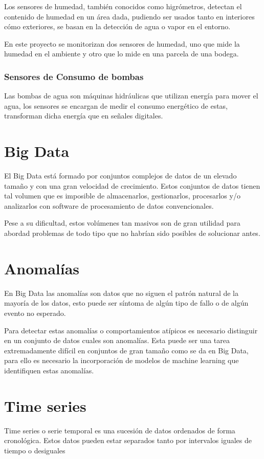 Los sensores de humedad, también conocidos como higrómetros, detectan el contenido de humedad en un área dada, pudiendo ser usados tanto en interiores cómo exteriores, se basan en la detección de agua o vapor en el entorno.

En este proyecto se monitorizan dos sensores de humedad, uno que mide la humedad en el ambiente y otro que lo mide en una parcela de una bodega.

\subsubsection{Sensores de Consumo de bombas}

Las bombas de agua son máquinas hidráulicas que utilizan energía para mover el agua, los sensores se encargan de medir el consumo energético de estas, transforman dicha energía que en señales digitales.  

\section{Big Data}

El Big Data está formado por conjuntos complejos de datos de un elevado tamaño y con una gran velocidad de crecimiento. Estos conjuntos de datos tienen tal volumen que es imposible de almacenarlos, gestionarlos, procesarlos y/o analizarlos con software de procesamiento de datos convencionales.

Pese a su dificultad, estos volúmenes tan masivos son de gran utilidad para abordad problemas de todo tipo que no habrían sido posibles de solucionar antes. \cite{pagina:Oracle_big_data}

\section{Anomalías}

En Big Data las anomalías son datos que no siguen el patrón natural de la mayoría de los datos, esto puede ser síntoma de algún tipo de fallo o de algún evento no esperado. 

Para detectar estas anomalías o comportamientos atípicos es necesario distinguir en un conjunto de datos cuales son anomalías. Esta puede ser una tarea extremadamente difícil en conjuntos de gran tamaño como se da en Big Data, para ello es necesario la incorporación de modelos de machine learning que identifiquen estas anomalías.\cite{pagina:anomalias}


\section{Time series}
Time series o serie temporal es una sucesión de datos ordenados de forma cronológica. Estos datos pueden estar separados tanto por intervalos iguales de tiempo o desiguales

